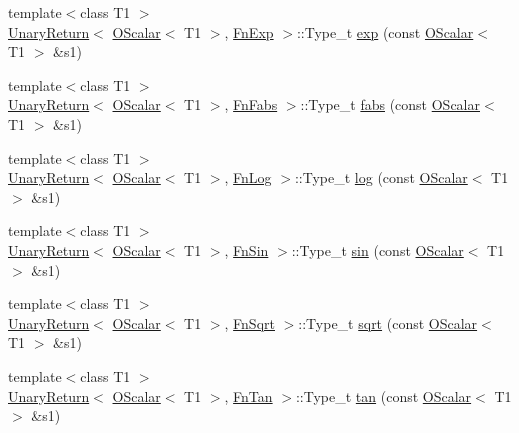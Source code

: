 \begin{DoxyCompactItemize}
\item 
{\footnotesize template$<$class T1 $>$ }\\\mbox{\hyperlink{structENSEM_1_1UnaryReturn}{Unary\+Return}}$<$ \mbox{\hyperlink{classENSEM_1_1OScalar}{O\+Scalar}}$<$ T1 $>$, \mbox{\hyperlink{structENSEM_1_1FnExp}{Fn\+Exp}} $>$\+::Type\+\_\+t \mbox{\hyperlink{group__obsscalar_ga9d0d193a9c41dfb71083e25b3fdc6a01}{exp}} (const \mbox{\hyperlink{classENSEM_1_1OScalar}{O\+Scalar}}$<$ T1 $>$ \&s1)
\item 
{\footnotesize template$<$class T1 $>$ }\\\mbox{\hyperlink{structENSEM_1_1UnaryReturn}{Unary\+Return}}$<$ \mbox{\hyperlink{classENSEM_1_1OScalar}{O\+Scalar}}$<$ T1 $>$, \mbox{\hyperlink{structENSEM_1_1FnFabs}{Fn\+Fabs}} $>$\+::Type\+\_\+t \mbox{\hyperlink{group__obsscalar_gaab3ff43b1817abbbfb1caf2c90110a0f}{fabs}} (const \mbox{\hyperlink{classENSEM_1_1OScalar}{O\+Scalar}}$<$ T1 $>$ \&s1)
\item 
{\footnotesize template$<$class T1 $>$ }\\\mbox{\hyperlink{structENSEM_1_1UnaryReturn}{Unary\+Return}}$<$ \mbox{\hyperlink{classENSEM_1_1OScalar}{O\+Scalar}}$<$ T1 $>$, \mbox{\hyperlink{structENSEM_1_1FnLog}{Fn\+Log}} $>$\+::Type\+\_\+t \mbox{\hyperlink{group__obsscalar_gac3f245df6eb6b0c94e6aa959b1e7676c}{log}} (const \mbox{\hyperlink{classENSEM_1_1OScalar}{O\+Scalar}}$<$ T1 $>$ \&s1)
\item 
{\footnotesize template$<$class T1 $>$ }\\\mbox{\hyperlink{structENSEM_1_1UnaryReturn}{Unary\+Return}}$<$ \mbox{\hyperlink{classENSEM_1_1OScalar}{O\+Scalar}}$<$ T1 $>$, \mbox{\hyperlink{structENSEM_1_1FnSin}{Fn\+Sin}} $>$\+::Type\+\_\+t \mbox{\hyperlink{group__obsscalar_ga2f881a4ba6a085af64243caa93001f49}{sin}} (const \mbox{\hyperlink{classENSEM_1_1OScalar}{O\+Scalar}}$<$ T1 $>$ \&s1)
\item 
{\footnotesize template$<$class T1 $>$ }\\\mbox{\hyperlink{structENSEM_1_1UnaryReturn}{Unary\+Return}}$<$ \mbox{\hyperlink{classENSEM_1_1OScalar}{O\+Scalar}}$<$ T1 $>$, \mbox{\hyperlink{structENSEM_1_1FnSqrt}{Fn\+Sqrt}} $>$\+::Type\+\_\+t \mbox{\hyperlink{group__obsscalar_ga8b8e13d0f31d513ae7c36827f65c0c61}{sqrt}} (const \mbox{\hyperlink{classENSEM_1_1OScalar}{O\+Scalar}}$<$ T1 $>$ \&s1)
\item 
{\footnotesize template$<$class T1 $>$ }\\\mbox{\hyperlink{structENSEM_1_1UnaryReturn}{Unary\+Return}}$<$ \mbox{\hyperlink{classENSEM_1_1OScalar}{O\+Scalar}}$<$ T1 $>$, \mbox{\hyperlink{structENSEM_1_1FnTan}{Fn\+Tan}} $>$\+::Type\+\_\+t \mbox{\hyperlink{group__obsscalar_ga9d270814e58292523d977713c693c876}{tan}} (const \mbox{\hyperlink{classENSEM_1_1OScalar}{O\+Scalar}}$<$ T1 $>$ \&s1)

\end{DoxyCompactItemize}
